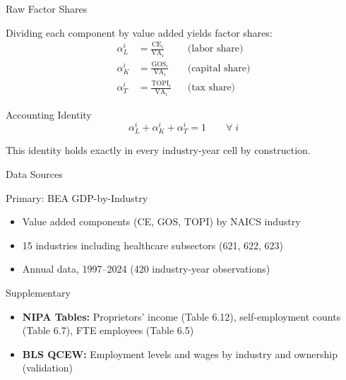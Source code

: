 \begin{frame}{Raw Factor Shares}

Dividing each component by value added yields factor shares:
%
\begin{align*}
    \alpha_L^i &= \frac{\text{CE}_i}{\text{VA}_i} & &\text{(labor share)} \\[6pt]
    \alpha_K^i &= \frac{\text{GOS}_i}{\text{VA}_i} & &\text{(capital share)} \\[6pt]
    \alpha_T^i &= \frac{\text{TOPI}_i}{\text{VA}_i} & &\text{(tax share)}
\end{align*}

\begin{alertblock}{Accounting Identity}
\begin{equation*}
    \alpha_L^i + \alpha_K^i + \alpha_T^i = 1 \qquad \forall \; i
\end{equation*}
\end{alertblock}

This identity holds exactly in every industry-year cell by construction.

\end{frame}

\begin{frame}{Data Sources}

\begin{block}{Primary: BEA GDP-by-Industry}
\begin{itemize}
    \item Value added components (CE, GOS, TOPI) by NAICS industry
    \item 15 industries including healthcare subsectors (621, 622, 623)
    \item Annual data, 1997--2024 (420 industry-year observations)
\end{itemize}
\end{block}

\begin{block}{Supplementary}
\begin{itemize}
    \item \textbf{NIPA Tables:} Proprietors' income (Table 6.12), self-employment counts (Table 6.7), FTE employees (Table 6.5)
    \item \textbf{BLS QCEW:} Employment levels and wages by industry and ownership (validation)
\end{itemize}
\end{block}

\end{frame}

